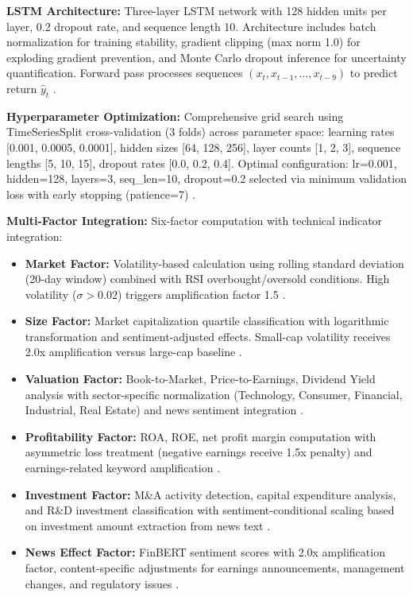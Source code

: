 \documentclass[3p,times,procedia]{elsarticle}
\begin{document}
\textbf{LSTM Architecture:} Three-layer LSTM network with 128 hidden units per layer, 0.2 dropout rate, and sequence length 10. Architecture includes batch normalization for training stability, gradient clipping (max norm 1.0) for exploding gradient prevention, and Monte Carlo dropout inference for uncertainty quantification. Forward pass processes sequences $(x_t, x_{t-1}, \ldots, x_{t-9})$ to predict return $\hat{y}_t$ \cite{Fischer2018}.

\textbf{Hyperparameter Optimization:} Comprehensive grid search using TimeSeriesSplit cross-validation (3 folds) across parameter space: learning rates [0.001, 0.0005, 0.0001], hidden sizes [64, 128, 256], layer counts [1, 2, 3], sequence lengths [5, 10, 15], dropout rates [0.0, 0.2, 0.4]. Optimal configuration: lr=0.001, hidden=128, layers=3, seq\_len=10, dropout=0.2 selected via minimum validation loss with early stopping (patience=7) \cite{Kingma2015}.

\textbf{Multi-Factor Integration:} Six-factor computation with technical indicator integration:
\begin{itemize}
\item \textbf{Market Factor:} Volatility-based calculation using rolling standard deviation (20-day window) combined with RSI overbought/oversold conditions. High volatility ($\sigma > 0.02$) triggers amplification factor 1.5 \cite{Nelson1991}.
\item \textbf{Size Factor:} Market capitalization quartile classification with logarithmic transformation and sentiment-adjusted effects. Small-cap volatility receives 2.0x amplification versus large-cap baseline \cite{FAMA1993}.
\item \textbf{Valuation Factor:} Book-to-Market, Price-to-Earnings, Dividend Yield analysis with sector-specific normalization (Technology, Consumer, Financial, Industrial, Real Estate) and news sentiment integration \cite{Harvey2016}.
\item \textbf{Profitability Factor:} ROA, ROE, net profit margin computation with asymmetric loss treatment (negative earnings receive 1.5x penalty) and earnings-related keyword amplification \cite{Daniel1998}.
\item \textbf{Investment Factor:} M\&A activity detection, capital expenditure analysis, and R\&D investment classification with sentiment-conditional scaling based on investment amount extraction from news text \cite{Carhart1997}.
\item \textbf{News Effect Factor:} FinBERT sentiment scores with 2.0x amplification factor, content-specific adjustments for earnings announcements, management changes, and regulatory issues \cite{TETLOCK2007}.
\end{itemize}
\end{document}
